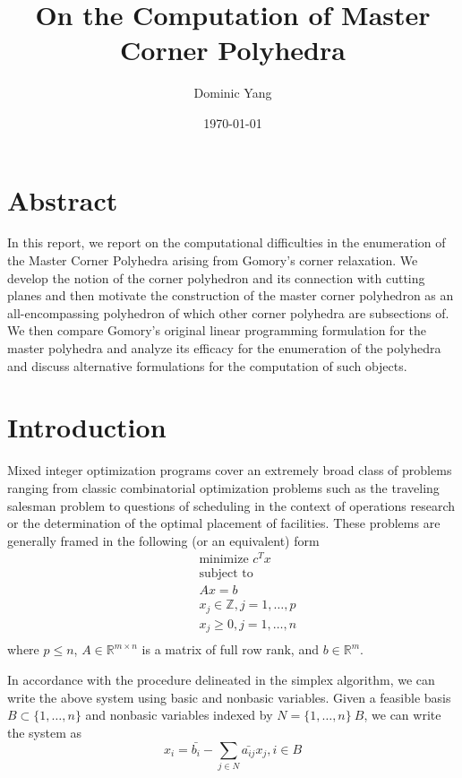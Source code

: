 \documentclass{article}
\author{Dominic Yang}
\title{On the Computation of Master Corner Polyhedra}
\date{\today}
\begin{document}
	\maketitle

	\section{Abstract}
	In this report, we report on the computational difficulties in the enumeration of the Master Corner Polyhedra arising from Gomory's corner relaxation. We develop the notion of the corner polyhedron and its connection with cutting planes and then motivate the construction of the master corner polyhedron as an all-encompassing polyhedron of which other corner polyhedra are subsections of. We then compare Gomory's original linear programming formulation for the master polyhedra and analyze its efficacy for the enumeration of the polyhedra and discuss alternative formulations for the computation of such objects.

	\section{Introduction}
	
	Mixed integer optimization programs cover an extremely broad class of problems ranging from classic combinatorial optimization problems such as the traveling salesman problem to questions of scheduling in the context of operations research or the determination of the optimal placement of facilities. These problems are generally framed in the following (or an equivalent) form
	\begin{equation*}
	\begin{aligned}
	& & & \text{minimize } c^T x \\
	& & & \text{subject to} \\
	& & & Ax = b \\
	& & & x_j \in \mathbb{Z}, j=1,\ldots,p \\
	& & & x_j \ge 0, j=1,\ldots,n \\
	\end{aligned}
	\end{equation*}
	where $p \le n$, $A \in \mathbb{R}^{m \times n}$ is a matrix of full row rank, and $b \in \mathbb{R}^m$. 
	
	In accordance with the procedure delineated in the simplex algorithm, we can write the above system using basic and nonbasic variables. Given a feasible basis $B \subset \{1,\ldots,n\}$ and nonbasic variables indexed by $N = \{1,\ldots,n\} \ B$, we can write the system as
	\begin{equation}
		x_i = \bar{b_i} - \sum_{j \in N}\bar{a_{ij}}x_j, i \in B
	\end{equation}
\end{document}
